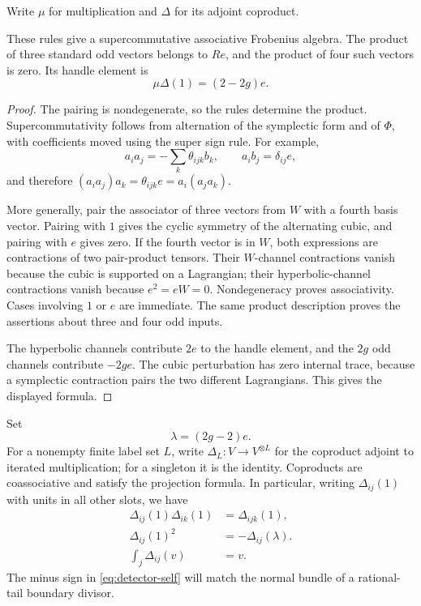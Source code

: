 Write \(\mu\) for multiplication and \(\Delta\) for its adjoint
coproduct.

\begin{lemma}
\label{lem:detector-algebra}
These rules give a supercommutative associative Frobenius algebra.
The product of three standard odd vectors belongs to \(Re\), and
the product of four such vectors is zero.  Its handle element is
\[
 \mu\Delta(1)=(2-2g)e.
\]
\end{lemma}

\begin{proof}
The pairing is nondegenerate, so the rules determine the product.
Supercommutativity follows from alternation of the symplectic form
and of \(\Phi\), with coefficients moved using the super sign rule.
For example,
\[
 a_i a_j=-\sum_k\theta_{ijk}b_k,
 \qquad a_i b_j=\delta_{ij}e,
\]
and therefore \((a_i a_j)a_k=\theta_{ijk}e
=a_i(a_j a_k)\).

More generally, pair the associator of three vectors from \(W\)
with a fourth basis vector.  Pairing with \(1\) gives the cyclic
symmetry of the alternating cubic, and pairing with \(e\) gives
zero.  If the fourth vector is in \(W\), both expressions are
contractions of two pair-product tensors.  Their \(W\)-channel
contractions vanish because the cubic is supported on a
Lagrangian; their hyperbolic-channel contractions vanish because
\(e^2=eW=0\).  Nondegeneracy proves associativity.  Cases involving
\(1\) or \(e\) are immediate.  The same product description proves
the assertions about three and four odd inputs.

The hyperbolic channels contribute \(2e\) to the handle element,
and the \(2g\) odd channels contribute \(-2ge\).  The cubic
perturbation has zero internal trace, because a symplectic
contraction pairs the two different Lagrangians.  This gives the
displayed formula.
\end{proof}

Set
\[
 \lambda=(2g-2)e.
\]
For a nonempty finite label set \(L\), write
\(\Delta_L:V\to V^{\otimes L}\) for the coproduct adjoint to
iterated multiplication; for a singleton it is the identity.
Coproducts are coassociative and satisfy the projection formula.
In particular, writing \(\Delta_{ij}(1)\) with units in all other
slots, we have
\begin{align}
 \Delta_{ij}(1)\Delta_{ik}(1)&=\Delta_{ijk}(1), \label{eq:detector-diagonals}\\
 \Delta_{ij}(1)^2&=-\Delta_{ij}(\lambda). \label{eq:detector-self}\\
 \int_j\Delta_{ij}(v)&=v. \label{eq:detector-counit}
\end{align}
The minus sign in \eqref{eq:detector-self} will match the normal
bundle of a rational-tail boundary divisor.

